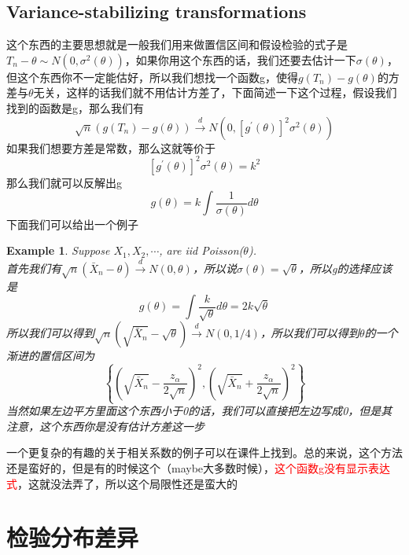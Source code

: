 \documentclass{article}
\newtheorem{example}{Example}[section]
\begin{document}
\subsection{Variance-stabilizing transformations}
这个东西的主要思想就是一般我们用来做置信区间和假设检验的式子是$T_n-\theta\sim N(0,\sigma^2(\theta))$，如果你用这个东西的话，我们还要去估计一下$\sigma(\theta)$，但这个东西你不一定能估好，所以我们想找一个函数g，使得$g(T_n)-g(\theta)$的方差与$\theta$无关，这样的话我们就不用估计方差了，下面简述一下这个过程，假设我们找到的函数是g，那么我们有
$$\sqrt{n}\left(g\left(T_n\right)-g(\theta)\right) \stackrel{d}{\rightarrow} N\left(0,\left[g^{\prime}(\theta)\right]^2 \sigma^2(\theta)\right)$$
如果我们想要方差是常数，那么这就等价于
$$\left[g^{\prime}(\theta)\right]^2 \sigma^2(\theta)=k^2$$
那么我们就可以反解出g
$$
g(\theta)=k \int \frac{1}{\sigma(\theta)} d \theta
$$
下面我们可以给出一个例子
\begin{example}
		Suppose $X_1,X_2,\cdots$, are iid Poisson($\theta$).\\
	
	首先我们有$\sqrt{n}(\bar{X}_n-\theta)\stackrel{d}{\rightarrow}N\left(0,\theta\right)$，所以说$\sigma(\theta)=\sqrt{\theta}$，所以g的选择应该是
	$$
	g(\theta)=\int \frac{k}{\sqrt{\theta}} d \theta=2 k \sqrt{\theta}
	$$
	所以我们可以得到$\sqrt{n}\left(\sqrt{\bar{X}_n}-\sqrt{\theta}\right) \stackrel{d}{\rightarrow} N(0,1 / 4)$，所以我们可以得到$\theta$的一个渐进的置信区间为
	$$
	\left\{\left(\sqrt{\bar{X}_n}-\frac{z_\alpha}{2 \sqrt{n}}\right)^2,\left(\sqrt{\bar{X}_n}+\frac{z_\alpha}{2 \sqrt{n}}\right)^2\right\}
	$$
	当然如果左边平方里面这个东西小于0的话，我们可以直接把左边写成0，但是其注意，这个东西你是没有估计方差这一步
\end{example}
一个更复杂的有趣的关于相关系数的例子可以在课件上找到。总的来说，这个方法还是蛮好的，但是有的时候这个（maybe大多数时候），\textcolor{red}{这个函数g没有显示表达式}，这就没法弄了，所以这个局限性还是蛮大的
\section{检验分布差异}
\end{document}
